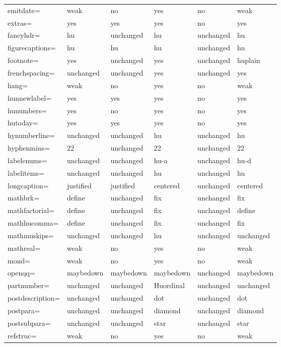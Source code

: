 \documentclass[12pt]{article}
\begin{document}
{\begin{longtable}{|l|l|l|l|l|l|}
emitdate= & weak & no & yes & no & weak \\
extras= & yes & yes & yes & no & yes \\
fancyhdr= & hu & unchanged & hu & unchanged & hu \\
figurecaptions= & hu & hu & hu & unchanged & hu \\
footnote= & yes & unchanged & yes & unchanged & huplain \\
frenchspacing= & unchanged & unchanged & yes & unchanged & yes \\
hang= & weak & no & yes & no & weak \\
hunnewlabel= & yes & yes & yes & no & yes \\
hunumbers= & yes & no & yes & no & yes \\
hutoday= & yes & yes & yes & no & yes \\
hynumberline= & unchanged & unchanged & hu & unchanged & hu \\
hyphenmins= & 22 & unchanged & 22 & unchanged & 22 \\
labelenums= & unchanged & unchanged & hu-a & unchanged & hu-d \\
labelitems= & unchanged & unchanged & hu & unchanged & hu \\
longcaption= & justified & justified & centered & unchanged & centered \\
mathbrk= & define & unchanged & fix & unchanged & fix \\
mathfactorial= & define & unchanged & fix & unchanged & define \\
mathhucomma= & define & unchanged & fix & unchanged & fix \\
mathmuskips= & unchanged & unchanged & hu & unchanged & unchanged \\
mathreal= & weak & no & yes & no & weak \\
mond= & weak & no & yes & no & weak \\
openqq= & maybedown & maybedown & maybedown & unchanged & maybedown \\
partnumber= & unchanged & unchanged & Huordinal & unchanged & unchanged \\
postdescription= & unchanged & unchanged & dot & unchanged & dot \\
postpara= & unchanged & unchanged & diamond & unchanged & diamond \\
postsubpara= & unchanged & unchanged & star & unchanged & star \\
refstruc= & weak & no & yes & no & weak \\

\end{longtable}}
\end{document}

